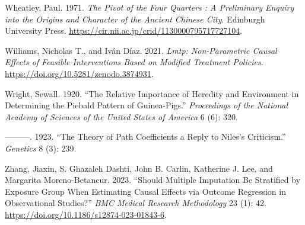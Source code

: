 \documentclass[
  singlecolumn]{article}
\newlength{\cslhangindent}
\newlength{\cslentryspacingunit} %
\newenvironment{CSLReferences}[2] %
 {%
  \setlength{\parindent}{0pt}
  \ifodd #1
  \let\oldpar\par
  \def\par{\hangindent=\cslhangindent\oldpar}
  \fi
  \setlength{\parskip}{#2\cslentryspacingunit}
 }%
 {}
\begin{document}
\begin{CSLReferences}{1}{0}
\leavevmode{}%
Wheatley, Paul. 1971. \emph{The Pivot of the Four Quarters : A
Preliminary Enquiry into the Origins and Character of the Ancient
Chinese City}. Edinburgh University Press.
\url{https://cir.nii.ac.jp/crid/1130000795717727104}.

\leavevmode{}%
Williams, Nicholas T., and Iván Díaz. 2021. \emph{Lmtp: Non-Parametric
Causal Effects of Feasible Interventions Based on Modified Treatment
Policies}. \url{https://doi.org/10.5281/zenodo.3874931}.

\leavevmode{}%
Wright, Sewall. 1920. {``The Relative Importance of Heredity and
Environment in Determining the Piebald Pattern of Guinea-Pigs.''}
\emph{Proceedings of the National Academy of Sciences of the United
States of America} 6 (6): 320.

\leavevmode{}%
---------. 1923. {``The Theory of Path Coefficients a Reply to Niles's
Criticism.''} \emph{Genetics} 8 (3): 239.

\leavevmode{}%
Zhang, Jiaxin, S. Ghazaleh Dashti, John B. Carlin, Katherine J. Lee, and
Margarita Moreno-Betancur. 2023. {``Should Multiple Imputation Be
Stratified by Exposure Group When Estimating Causal Effects via Outcome
Regression in Observational Studies?''} \emph{BMC Medical Research
Methodology} 23 (1): 42.
\url{https://doi.org/10.1186/s12874-023-01843-6}.

\end{CSLReferences}
\end{document}
